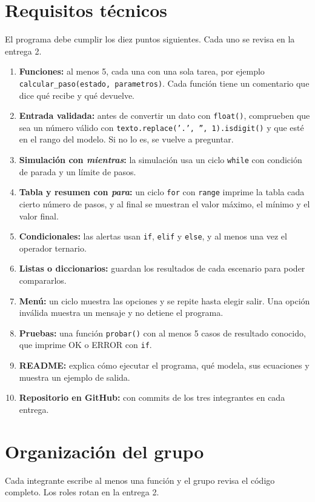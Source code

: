 \documentclass[doc]{apa6}
\begin{document}
\section*{Requisitos técnicos}
El programa debe cumplir los diez puntos siguientes. Cada uno se revisa en la entrega 2.
\begin{enumerate}
    \item \textbf{Funciones:} al menos 5, cada una con una sola tarea, por ejemplo \texttt{calcular\_paso(estado, parametros)}. Cada función tiene un comentario que dice qué recibe y qué devuelve.
    \item \textbf{Entrada validada:} antes de convertir un dato con \texttt{float()}, comprueben que sea un número válido con \texttt{texto.replace('.', '', 1).isdigit()} y que esté en el rango del modelo. Si no lo es, se vuelve a preguntar.
    \item \textbf{Simulación con \emph{mientras}:} la simulación usa un ciclo \texttt{while} con condición de parada y un límite de pasos.
    \item \textbf{Tabla y resumen con \emph{para}:} un ciclo \texttt{for} con \texttt{range} imprime la tabla cada cierto número de pasos, y al final se muestran el valor máximo, el mínimo y el valor final.
    \item \textbf{Condicionales:} las alertas usan \texttt{if}, \texttt{elif} y \texttt{else}, y al menos una vez el operador ternario.
    \item \textbf{Listas o diccionarios:} guardan los resultados de cada escenario para poder compararlos.
    \item \textbf{Menú:} un ciclo muestra las opciones y se repite hasta elegir salir. Una opción inválida muestra un mensaje y no detiene el programa.
    \item \textbf{Pruebas:} una función \texttt{probar()} con al menos 5 casos de resultado conocido, que imprime OK o ERROR con \texttt{if}.
    \item \textbf{README:} explica cómo ejecutar el programa, qué modela, sus ecuaciones y muestra un ejemplo de salida.
    \item \textbf{Repositorio en GitHub:} con commits de los tres integrantes en cada entrega.
\end{enumerate}
\newpage
\section*{Organización del grupo}
Cada integrante escribe al menos una función y el grupo revisa el código completo. Los roles rotan en la entrega 2.
\end{document}

